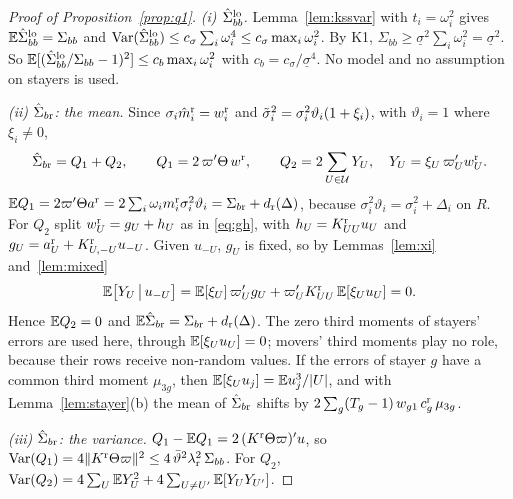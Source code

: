 \begin{proof}[Proof of Proposition~\ref{prop:q1}]
\emph{(i) $\hat\Sigma_{bb}^{\rm lo}$.} Lemma~\ref{lem:kssvar} with $t_i=\omega_i^2$ gives
$\mathbb{E}\hat\Sigma_{bb}^{\rm lo}=\Sigma_{bb}$ and
$\operatorname{Var}(\hat\Sigma_{bb}^{\rm lo})\le c_\sigma\sum_i\omega_i^4\le c_\sigma\max_i\omega_i^2$. By K1,
$\Sigma_{bb}\ge\underline\sigma^2\sum_i\omega_i^2=\underline\sigma^2$. So
$\mathbb{E}[(\hat\Sigma_{bb}^{\rm lo}/\Sigma_{bb}-1)^2]\le c_b\max_i\omega_i^2$ with $c_b=c_\sigma/\underline\sigma^4$. No
model and no assumption on stayers is used.

\emph{(ii) $\hat\Sigma_{b{\rm r}}$: the mean.} Since $\sigma_i\hat m^{\rm r}_i=w^{\rm r}_i$ and
$\tilde\sigma_i^2=\sigma_i^2\vartheta_i(1+\xi_i)$, with $\vartheta_i=1$ where $\xi_i\ne0$,
\[
\hat\Sigma_{b{\rm r}}=Q_1+Q_2,\qquad Q_1=2\,\varpi'\Theta\,w^{\rm r},\qquad
Q_2=2\sum_{U\in\mathcal{U}}Y_U,\quad Y_U=\xi_U\,\varpi_U'w^{\rm r}_U .
\]
$\mathbb{E} Q_1=2\varpi'\Theta a^{\rm r}=2\sum_i\omega_im_i^{\rm r}\sigma_i^2\vartheta_i=\Sigma_{b{\rm r}}+d_{\rm r}(\Delta)$,
because $\sigma_i^2\vartheta_i=\sigma_i^2+\Delta_i$ on $R$. For $Q_2$ split $w^{\rm r}_U=g_U+h_U$ as in
\eqref{eq:gh}, with $h_U=K^{\rm r}_{UU}u_U$ and $g_U=a^{\rm r}_U+K^{\rm r}_{U,-U}u_{-U}$. Given $u_{-U}$, $g_U$ is
fixed, so by Lemmas~\ref{lem:xi} and~\ref{lem:mixed}
\begin{equation}\label{eq:Ycond}
\mathbb{E}\big[Y_U\,\big|\,u_{-U}\big]=\mathbb{E}[\xi_U]\,\varpi_U'g_U+\varpi_U'K^{\rm r}_{UU}\,\mathbb{E}[\xi_Uu_U]=0 .
\end{equation}
Hence $\mathbb{E} Q_2=0$ and $\mathbb{E}\hat\Sigma_{b{\rm r}}=\Sigma_{b{\rm r}}+d_{\rm r}(\Delta)$. The zero third moments of
stayers' errors are used here, through $\mathbb{E}[\xi_Uu_U]=0$; movers' third moments play no role, because their
rows receive non-random values. If the errors of stayer $g$ have a common third moment $\mu_{3g}$, then
$\mathbb{E}[\xi_Uu_j]=\mathbb{E} u_j^3/|U|$, and with Lemma~\ref{lem:stayer}(b) the mean of $\hat\Sigma_{b{\rm r}}$ shifts by
$2\sum_g(T_g-1)\,w_{g1}\,c_g^{\rm r}\,\mu_{3g}$.

\emph{(iii) $\hat\Sigma_{b{\rm r}}$: the variance.} $Q_1-\mathbb{E} Q_1=2\,(K^{\rm r}\Theta\varpi)'u$, so
$\operatorname{Var}(Q_1)=4\|K^{\rm r}\Theta\varpi\|^2\le4\,\bar\vartheta^2\lambda_{\rm r}^2\,\Sigma_{bb}$. For $Q_2$,
$\operatorname{Var}(Q_2)=4\sum_U\mathbb{E} Y_U^2+4\sum_{U\ne U'}\mathbb{E}[Y_UY_{U'}]$.


\end{proof}
